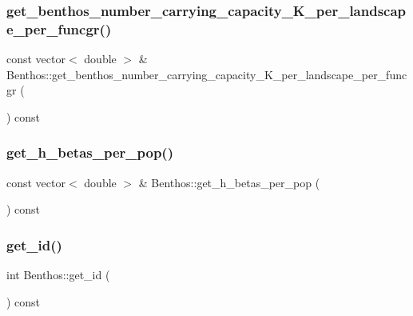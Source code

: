 \mbox{\label{class_benthos_a81cc29213885d1d3a1b7b754bde8631d}} 
\subsubsection{\texorpdfstring{get\_benthos\_number\_carrying\_capacity\_K\_per\_landscape\_per\_funcgr()}{get\_benthos\_number\_carrying\_capacity\_K\_per\_landscape\_per\_funcgr()}}
{\footnotesize\ttfamily const vector$<$ double $>$ \& Benthos\+::get\+\_\+benthos\+\_\+number\+\_\+carrying\+\_\+capacity\+\_\+\+K\+\_\+per\+\_\+landscape\+\_\+per\+\_\+funcgr (\begin{DoxyParamCaption}{ }\end{DoxyParamCaption}) const}

\mbox{\label{class_benthos_ae659a0c8e7de285446a63c6a15fd0321}} 
\subsubsection{\texorpdfstring{get\_h\_betas\_per\_pop()}{get\_h\_betas\_per\_pop()}}
{\footnotesize\ttfamily const vector$<$ double $>$ \& Benthos\+::get\+\_\+h\+\_\+betas\+\_\+per\+\_\+pop (\begin{DoxyParamCaption}{ }\end{DoxyParamCaption}) const}

\mbox{\label{class_benthos_a893fc51faf9c73ddeb91eb548c9bed48}} 
\subsubsection{\texorpdfstring{get\_id()}{get\_id()}}
{\footnotesize\ttfamily int Benthos\+::get\+\_\+id (\begin{DoxyParamCaption}{ }\end{DoxyParamCaption}) const}

